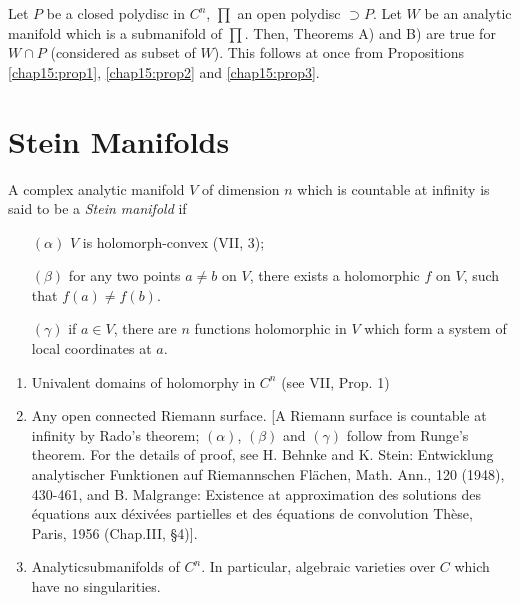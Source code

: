 \begin{proposition}\label{chap15:prop4}
Let $P$ be a closed polydisc in $C^n$, $\prod$ an open polydisc
$\supset P$. Let $W$ be an analytic manifold which is a submanifold of
$\prod$. Then, Theorems A) and B) are true for $W \cap P$ (considered
as subset of $W$). This follows at once from Propositions
\ref{chap15:prop1}, \ref{chap15:prop2} and \ref{chap15:prop3}. 
\end{proposition}

\section{Stein Manifolds}\label{chap15:sec3}

\begin{defi*}
A complex analytic manifold $V$ of dimension $n$ which is countable at
infinity is said to be a \textit{Stein manifold} if
\begin{itemize}
\item[$(\alpha)$] $V$ is holomorph-convex (VII, 3);

\item[$(\beta)$] for any two points $a \neq b$ on $V$, there exists a 
holomorphic $f$ on $V$, such that $f(a) \neq f(b)$. 

\item[$(\gamma)$] if $a \in V$, there are $n$ functions holomorphic in
  $V$ which form a system of local coordinates at $a$.
\end{itemize}
\end{defi*}

\medskip
{}
\begin{enumerate}
\item Univalent domains of holomorphy in $C^n$ (see VII, Prop. 1)

\item Any open connected Riemann surface. [A Riemann surface is
  countable at infinity by Rado's theorem; $(\alpha)$, $(\beta)$ and
  $(\gamma)$ follow from Runge's theorem. For the details of proof,
  see H. Behnke and K. Stein: Entwicklung analytischer Funktionen auf
  Riemann\-schen Fl\"achen, Math. Ann., 120 (1948), 430-461, and
  B. Malgrange: Existence at approximation des solutions des
  \'equations aux d\'exiv\'ees partielles et des \'equations de
  convolution Th\`ese, Paris, 1956 (Chap.III, \S 4)]. 

\item Analytic\pageoriginale submanifolds of $C^n$. In particular, algebraic
  varieties over $C$ which have no singularities.
\end{enumerate}

